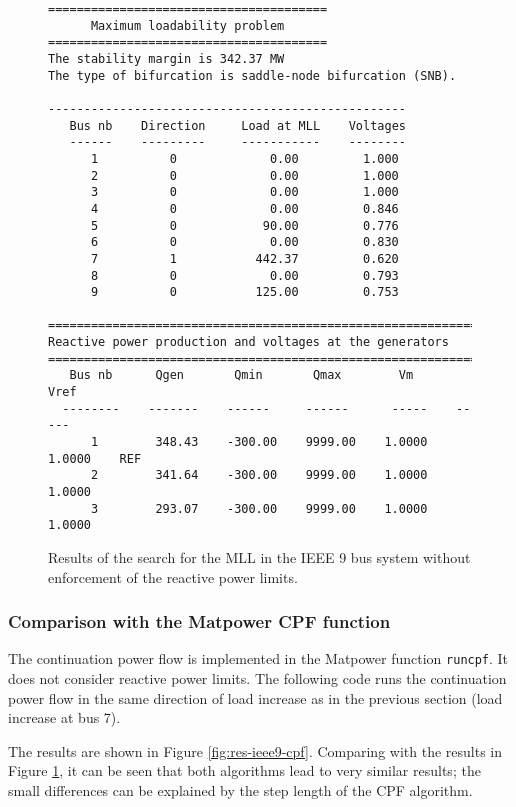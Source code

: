 \documentclass[12pt,a4]{article}
\newcommand*{\codemat}[1]{\texttt{#1}}
\newcommand*{\matpower}{{\sc Matpower}}
\begin{document}
\begin{figure}[!hb]
  \centering
\begin{verbatim}
=======================================
      Maximum loadability problem
=======================================
The stability margin is 342.37 MW
The type of bifurcation is saddle-node bifurcation (SNB).

--------------------------------------------------
   Bus nb    Direction     Load at MLL    Voltages 
   ------    ---------     -----------    --------
      1          0             0.00         1.000
      2          0             0.00         1.000
      3          0             0.00         1.000
      4          0             0.00         0.846
      5          0            90.00         0.776
      6          0             0.00         0.830
      7          1           442.37         0.620
      8          0             0.00         0.793
      9          0           125.00         0.753

=============================================================
Reactive power production and voltages at the generators
=============================================================
   Bus nb      Qgen       Qmin       Qmax        Vm      Vref
  --------    -------    ------     ------      -----    -----
      1        348.43    -300.00    9999.00    1.0000   1.0000    REF
      2        341.64    -300.00    9999.00    1.0000   1.0000
      3        293.07    -300.00    9999.00    1.0000   1.0000
\end{verbatim}  
  \caption{Results of the search for the MLL in the IEEE 9 bus system without enforcement of the reactive power limits.}\label{fig:res-ieee9-noQ}
\end{figure}

\subsubsection{Comparison with the \matpower{} CPF function}
\label{sec:comp-with-matp}

The continuation power flow is implemented in the \matpower{} function \codemat{runcpf}.
It does not consider reactive power limits.
The following code runs the continuation power flow in the same direction of load increase as in the previous section (load increase at bus 7).



The results are shown in Figure \ref{fig:res-ieee9-cpf}.
Comparing with the results in Figure \ref{fig:res-ieee9-noQ}, it can be seen that both algorithms lead to very similar results; the small differences can be explained by the step length of the CPF algorithm.
\end{document}
